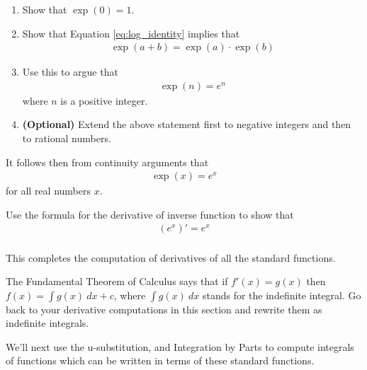 \begin{exercise}
	\begin{enumerate}
		\item Show that $\exp(0) = 1$.
		\item Show that Equation \eqref{eq:log_identity} implies that
		\begin{align*}
			\exp(a + b) = \exp(a) \cdot \exp(b)
		\end{align*}
		\item Use this to argue that
		\begin{align*}
			\exp(n) = e^n
		\end{align*}
		where $n$ is a positive integer.
		\item {\bf (Optional)} Extend the above statement first to negative integers and then to rational numbers.
	\end{enumerate}
	It follows then from continuity arguments that
	\begin{align*}
		\exp(x) = e^x
	\end{align*}
	for all real numbers $x$.
\end{exercise}


\begin{exercise}
	Use the formula for the derivative of inverse function to show that
	\begin{align*}
		\left(e^x\right)'=e^x\\
	\end{align*}
\end{exercise}



This completes the computation of derivatives of all the standard functions.

\begin{exercise}
	The Fundamental Theorem of Calculus says that if $f'(x)=g(x)$ then $f(x) = \int g(x)\: dx + c $, where $\int g(x)\: dx$ stands for the indefinite integral.
	Go back to your derivative computations in this section and rewrite them as indefinite integrals.
\end{exercise}

We'll next use the u-substitution, and Integration by Parts to compute integrals of functions which can be written in terms of these standard functions.














\newpage
